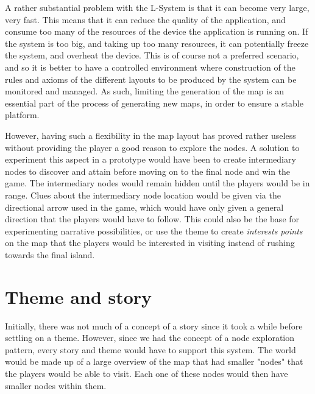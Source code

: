 A rather substantial problem with the L-System is that it can become very large, very fast. This means that it can reduce the quality of the application, and consume too many of the resources of the device the application is running on. If the system is too big, and taking up too many resources, it can potentially freeze the system, and overheat the device. This is of course not a preferred scenario, and so it is better to have a controlled environment where construction of the rules and axioms of the different layouts to be produced by the system can be monitored and managed. As such, limiting the generation of the map is an essential part of the process of generating new maps, in order to ensure a stable platform.

However, having such a flexibility in the map layout has proved rather useless without providing the player a good reason to explore the nodes. A solution to experiment this aspect in a prototype would have been to create intermediary nodes to discover and attain before moving on to the final node and win the game. The intermediary nodes would remain hidden until the players would be in range. Clues about the intermediary node location would be given via the directional arrow used in the game, which would have only given a general direction that the players would have to follow. This could also be the base for experimenting narrative possibilities, or use the theme to create \textit{interests points} on the map that the players would be interested in visiting instead of rushing towards the final island.

\section{Theme and story}
Initially, there was not much of a concept of a story since it took a while before settling on a theme. However, since we had the concept of a node exploration pattern, every story and theme would have to support this system. The world would be made up of a large overview of the map that had smaller "nodes" that the players would be able to visit. Each one of these nodes would then have smaller nodes within them.

